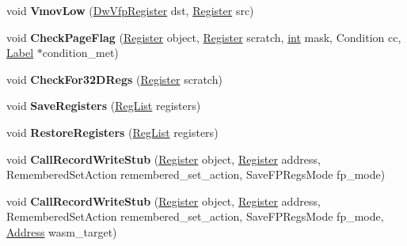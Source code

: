 \begin{DoxyCompactItemize}
\item 
\mbox{\label{classv8_1_1internal_1_1TurboAssembler_ad34cc59db6f3da4149ad91b34d9665db}} 
void {\bfseries Vmov\+Low} (\mbox{\hyperlink{classv8_1_1internal_1_1DwVfpRegister}{Dw\+Vfp\+Register}} dst, \mbox{\hyperlink{classv8_1_1internal_1_1Register}{Register}} src)
\item 
\mbox{\label{classv8_1_1internal_1_1TurboAssembler_a1fa4aee7654610ffc02bdac3ddd102c3}} 
void {\bfseries Check\+Page\+Flag} (\mbox{\hyperlink{classv8_1_1internal_1_1Register}{Register}} object, \mbox{\hyperlink{classv8_1_1internal_1_1Register}{Register}} scratch, \mbox{\hyperlink{classint}{int}} mask, Condition cc, \mbox{\hyperlink{classv8_1_1internal_1_1Label}{Label}} $\ast$condition\+\_\+met)
\item 
\mbox{\label{classv8_1_1internal_1_1TurboAssembler_aee306fe653a9c87926d86122f7679afa}} 
void {\bfseries Check\+For32\+D\+Regs} (\mbox{\hyperlink{classv8_1_1internal_1_1Register}{Register}} scratch)
\item 
\mbox{\label{classv8_1_1internal_1_1TurboAssembler_adb2676d473b8bdff1c6856758eabfa71}} 
void {\bfseries Save\+Registers} (\mbox{\hyperlink{classuint32__t}{Reg\+List}} registers)
\item 
\mbox{\label{classv8_1_1internal_1_1TurboAssembler_a1ff5e6044d8b7223b66061f3ed4123f1}} 
void {\bfseries Restore\+Registers} (\mbox{\hyperlink{classuint32__t}{Reg\+List}} registers)
\item 
\mbox{\label{classv8_1_1internal_1_1TurboAssembler_ab10280acd4d7aebd053a430cbea68fb1}} 
void {\bfseries Call\+Record\+Write\+Stub} (\mbox{\hyperlink{classv8_1_1internal_1_1Register}{Register}} object, \mbox{\hyperlink{classv8_1_1internal_1_1Register}{Register}} address, Remembered\+Set\+Action remembered\+\_\+set\+\_\+action, Save\+F\+P\+Regs\+Mode fp\+\_\+mode)
\item 
\mbox{\label{classv8_1_1internal_1_1TurboAssembler_a2bc1271b1999cb2ee3784489515931b6}} 
void {\bfseries Call\+Record\+Write\+Stub} (\mbox{\hyperlink{classv8_1_1internal_1_1Register}{Register}} object, \mbox{\hyperlink{classv8_1_1internal_1_1Register}{Register}} address, Remembered\+Set\+Action remembered\+\_\+set\+\_\+action, Save\+F\+P\+Regs\+Mode fp\+\_\+mode, \mbox{\hyperlink{classuintptr__t}{Address}} wasm\+\_\+target)

\end{DoxyCompactItemize}
